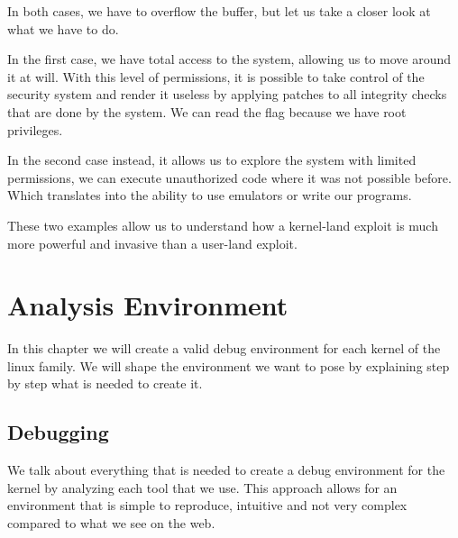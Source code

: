 \documentclass{masterthesis}
\begin{document}
In both cases, we have to overflow the buffer, but let us take a closer look at what we have to do.

In the first case, we have total access to the system, allowing us to move around it at will.
With this level of permissions, it is possible to take control of the security system and render it useless by applying patches to all integrity checks that are done by the system.
We can read the flag because we have root privileges.

In the second case instead, it allows us to explore the system with limited permissions, we can execute unauthorized code where it was not possible before. Which translates into the ability to use emulators or write our programs.

These two examples allow us to understand how a kernel-land exploit is much more powerful and invasive than a user-land exploit.


\chapter{Analysis Environment}
\label{ch:analyze}
In this chapter we will create a valid debug environment for each kernel of the linux family.
We will shape the environment we want to pose by explaining step by step what is needed to create it.
\section{Debugging}
\label{sect:debugging}
We talk about everything that is needed to create a debug environment for the kernel by analyzing each tool that we use.
This approach allows for an environment that is simple to reproduce, intuitive and not very complex compared to what we see on the web.
\end{document}
